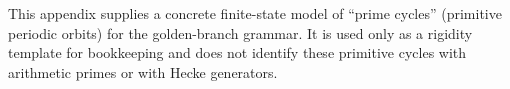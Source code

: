 \begin{remark}\label{rem:zeckendorf_shift_structural_role}
\AuditTag This appendix supplies a concrete finite-state model of ``prime cycles'' (primitive periodic orbits) for the golden-branch grammar.
It is used only as a rigidity template for bookkeeping and does not identify these primitive cycles with arithmetic primes or with Hecke generators.
\end{remark}

